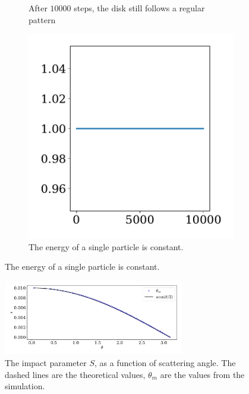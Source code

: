 \documentclass{article}
\begin{document}
\begin{figure}[H]
\begin{subfigure}{.35\textwidth}
            \caption{After $10 000$ steps, the disk still follows a regular pattern}
            \label{single particle}
        \end{subfigure}
        \begin{subfigure}{.64\textwidth}
            \centering
            \includegraphics[width=.8\textwidth]{../plots/test_case_one_particle/energy.pdf}
            \caption{The energy of a single particle is constant.}
            \label{single particle energy}
        \end{subfigure}
    \end{figure}

    \begin{figure}[H]
        \centering
        \hspace{-10mm}
        \includegraphics[width=0.7\textwidth]{../plots/test_case_collision_angle/collision_angle.pdf}
        \caption{The impact parameter $S$, as a function of scattering angle. The dashed lines are the theoretical values, $\theta_m$ are the values from the simulation.}
        \label{scattering}
    \end{figure}
\end{document}
